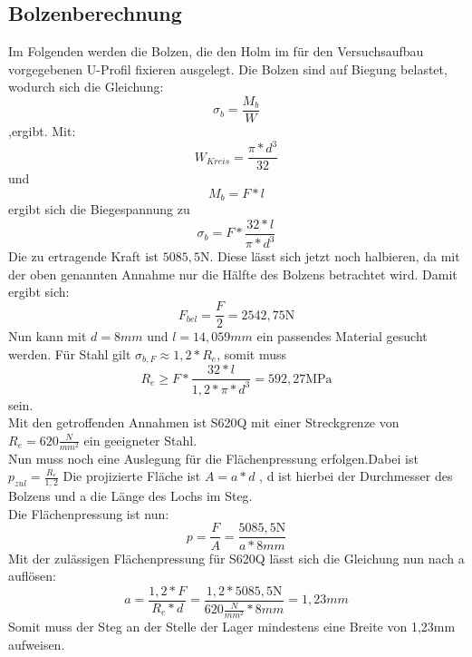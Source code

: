 
\subsection{Bolzenberechnung}
Im Folgenden werden die Bolzen, die den Holm im für den Versuchsaufbau vorgegebenen U-Profil fixieren ausgelegt. Die Bolzen sind auf Biegung belastet, wodurch sich die Gleichung:
$$\sigma_{b}=\frac{M_{b}}{W} $$
 ,ergibt.
 Mit: $$W_{Kreis}=\frac{\pi*d^{3}}{32}$$
 und $$M_{b}=F*l$$
 ergibt sich die Biegespannung zu
 $$\sigma_{b}=F*\frac{32*l}{\pi*d^{3}}$$
Die zu ertragende Kraft ist $5085,5 \mathrm{N}$. Diese lässt sich jetzt noch halbieren, da mit der oben genannten Annahme nur die Hälfte des Bolzens betrachtet wird. Damit ergibt sich:
 $$F_{bel}=\frac{F}{2} =2542,75 \mathrm{N}$$
 Nun kann mit $d=8mm$ und $l=14,059mm$ ein passendes Material gesucht werden. Für Stahl gilt $\sigma_{b,F}\approx1,2*R_{e}$, somit muss $$R_{e}\geq F*\frac{32*l}{1,2*\pi*d^{3}}=592,27\mathrm{MPa}$$ sein.\\
 Mit den getroffenden Annahmen ist S620Q mit einer Streckgrenze von $R_{e}=620\frac{N}{mm^{2}}$ ein geeigneter Stahl.\\
Nun muss noch eine Auslegung für die Flächenpressung erfolgen.Dabei ist $p_{zul}=\frac{R_{e}}{1,2}$
Die projizierte Fläche ist $A=a*d$ , d ist hierbei der Durchmesser des Bolzens und a die Länge des Lochs im Steg.\\
Die Flächenpressung ist nun: $$p=\frac{F}{A}=\frac{5085,5\mathrm{N}}{a*8mm}$$
Mit der zulässigen Flächenpressung für S620Q lässt sich die Gleichung nun nach a auflösen:
$$a=\frac{1,2*F}{R_{e}*d}=\frac{1,2*5085,5\mathrm{N}}{620\frac{N}{mm^{2}}*8mm}=1,23mm$$
Somit muss der Steg an der Stelle der Lager mindestens eine Breite von 1,23$\mathrm{mm}$ aufweisen.
 
 
 
 
  
 

